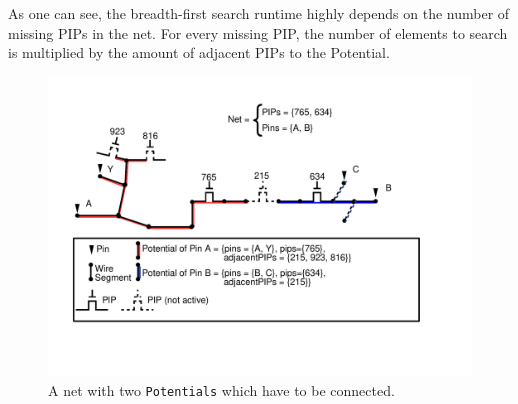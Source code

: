 As one can see, the breadth-first search runtime highly depends on the number of missing PIPs in the net. For every missing PIP, the number of elements to search is multiplied by the amount of adjacent PIPs to the Potential.

\begin{figure}
\centering
\includegraphics[scale=0.65]{images/brokenpotentials.pdf}
\caption{A net with two \texttt{Potentials} which have to be connected.}
\label{fig:brokenpotentials}
\end{figure}



